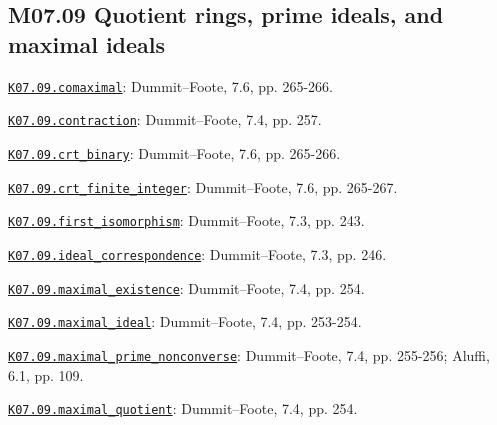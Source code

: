 \subsection*{M07.09 Quotient rings, prime ideals, and maximal ideals}
\par\smallskip\noindent\hypertarget{src:K07.09.comaximal}{}\label{src:K07.09.comaximal}\hyperref[K07.09.comaximal]{\texttt{K07.09.comaximal}}: Dummit--Foote, 7.6, pp. 265-266.
\par\smallskip\noindent\hypertarget{src:K07.09.contraction}{}\label{src:K07.09.contraction}\hyperref[K07.09.contraction]{\texttt{K07.09.contraction}}: Dummit--Foote, 7.4, pp. 257.
\par\smallskip\noindent\hypertarget{src:K07.09.crt_binary}{}\label{src:K07.09.crt_binary}\hyperref[K07.09.crt_binary]{\texttt{K07.09.crt\_binary}}: Dummit--Foote, 7.6, pp. 265-266.
\par\smallskip\noindent\hypertarget{src:K07.09.crt_finite_integer}{}\label{src:K07.09.crt_finite_integer}\hyperref[K07.09.crt_finite_integer]{\texttt{K07.09.crt\_finite\_integer}}: Dummit--Foote, 7.6, pp. 265-267.
\par\smallskip\noindent\hypertarget{src:K07.09.first_isomorphism}{}\label{src:K07.09.first_isomorphism}\hyperref[K07.09.first_isomorphism]{\texttt{K07.09.first\_isomorphism}}: Dummit--Foote, 7.3, pp. 243.
\par\smallskip\noindent\hypertarget{src:K07.09.ideal_correspondence}{}\label{src:K07.09.ideal_correspondence}\hyperref[K07.09.ideal_correspondence]{\texttt{K07.09.ideal\_correspondence}}: Dummit--Foote, 7.3, pp. 246.
\par\smallskip\noindent\hypertarget{src:K07.09.maximal_existence}{}\label{src:K07.09.maximal_existence}\hyperref[K07.09.maximal_existence]{\texttt{K07.09.maximal\_existence}}: Dummit--Foote, 7.4, pp. 254.
\par\smallskip\noindent\hypertarget{src:K07.09.maximal_ideal}{}\label{src:K07.09.maximal_ideal}\hyperref[K07.09.maximal_ideal]{\texttt{K07.09.maximal\_ideal}}: Dummit--Foote, 7.4, pp. 253-254.
\par\smallskip\noindent\hypertarget{src:K07.09.maximal_prime_nonconverse}{}\label{src:K07.09.maximal_prime_nonconverse}\hyperref[K07.09.maximal_prime_nonconverse]{\texttt{K07.09.maximal\_prime\_nonconverse}}: Dummit--Foote, 7.4, pp. 255-256; Aluffi, 6.1, pp. 109.
\par\smallskip\noindent\hypertarget{src:K07.09.maximal_quotient}{}\label{src:K07.09.maximal_quotient}\hyperref[K07.09.maximal_quotient]{\texttt{K07.09.maximal\_quotient}}: Dummit--Foote, 7.4, pp. 254.

